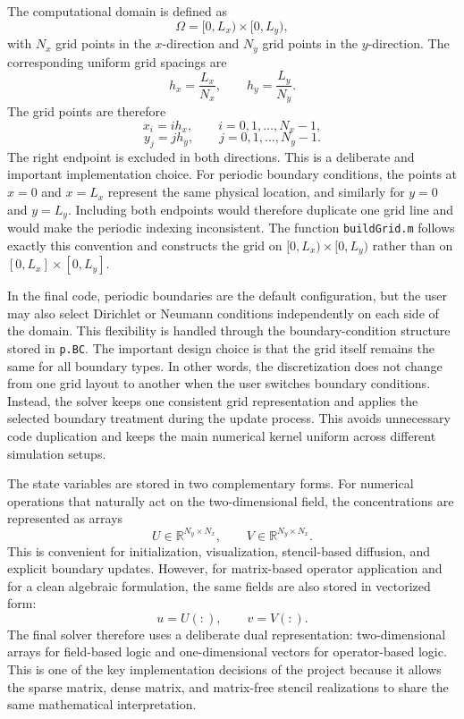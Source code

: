 The computational domain is defined as
\[
\Omega = [0,L_x)\times[0,L_y),
\]
with $N_x$ grid points in the $x$-direction and $N_y$ grid points in the $y$-direction. The corresponding uniform grid spacings are
\begin{equation}
h_x = \frac{L_x}{N_x},
\qquad
h_y = \frac{L_y}{N_y}.
\label{eq:grid_spacing_numimpl}
\end{equation}
The grid points are therefore
\[
x_i = i h_x,\qquad i=0,1,\dots,N_x-1,
\]
\[
y_j = j h_y,\qquad j=0,1,\dots,N_y-1.
\]
The right endpoint is excluded in both directions. This is a deliberate and important implementation choice. For periodic boundary conditions, the points at $x=0$ and $x=L_x$ represent the same physical location, and similarly for $y=0$ and $y=L_y$. Including both endpoints would therefore duplicate one grid line and would make the periodic indexing inconsistent. The function \texttt{buildGrid.m} follows exactly this convention and constructs the grid on $[0,L_x)\times[0,L_y)$ rather than on $[0,L_x]\times[0,L_y]$.

In the final code, periodic boundaries are the default configuration, but the user may also select Dirichlet or Neumann conditions independently on each side of the domain. This flexibility is handled through the boundary-condition structure stored in \texttt{p.BC}. The important design choice is that the grid itself remains the same for all boundary types. In other words, the discretization does not change from one grid layout to another when the user switches boundary conditions. Instead, the solver keeps one consistent grid representation and applies the selected boundary treatment during the update process. This avoids unnecessary code duplication and keeps the main numerical kernel uniform across different simulation setups.

The state variables are stored in two complementary forms. For numerical operations that naturally act on the two-dimensional field, the concentrations are represented as arrays
\[
U \in \mathbb{R}^{N_y \times N_x},
\qquad
V \in \mathbb{R}^{N_y \times N_x}.
\]
This is convenient for initialization, visualization, stencil-based diffusion, and explicit boundary updates. However, for matrix-based operator application and for a clean algebraic formulation, the same fields are also stored in vectorized form:
\[
u = U(:),
\qquad
v = V(:).
\]
The final solver therefore uses a deliberate dual representation: two-dimensional arrays for field-based logic and one-dimensional vectors for operator-based logic. This is one of the key implementation decisions of the project because it allows the sparse matrix, dense matrix, and matrix-free stencil realizations to share the same mathematical interpretation.

